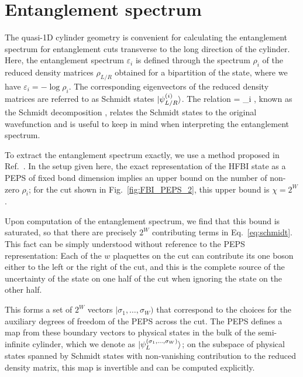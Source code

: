 
\newcommand{\uL}{\mathbf{L_0}}
\newcommand{\bL}{\mathbf{\bar{L}_0}}

\section{Entanglement spectrum}
\label{sec:ES}

The quasi-1D cylinder geometry is convenient for calculating the
entanglement spectrum for entanglement cuts transverse to the long direction of the
cylinder. Here, the entanglement spectrum $\varepsilon_i$ is defined through the spectrum
$\rho_i$ of the reduced density matrices $\rho_{L/R}$ obtained for a bipartition of the state,
where we have $\varepsilon_i = -\log \rho_i$.
The corresponding eigenvectors of the reduced density matrices
are referred to as Schmidt states $\vert \psi^{(i)}_{L/R} \rangle$. 
The relation 
\beq
\ket{\psi} = \sum\limits_i 
,
\label{eq:schmidt}
\eeq
known as the Schmidt decomposition \cite{Schmidt?},
relates the Schmidt states to the original wavefunction and is useful to keep in mind
when interpreting the entanglement spectrum.

To extract the entanglement spectrum exactly,
we use a method proposed in Ref.~.
In the setup given here, the exact representation of the HFBI state as a PEPS of
fixed bond dimension implies an upper bound on the number of non-zero $\rho_i$; 
for the cut shown in Fig.~\ref{fig:FBI_PEPS_2}, this upper bound is $\chi=2^W$.

Upon computation of the entanglement spectrum, we find that this bound is saturated,
so that there are precisely $2^W$ contributing terms in Eq.~\ref{eq:schmidt}.
This fact can be simply understood without reference to the PEPS representation:
Each of the $w$ plaquettes on the cut can contribute its one boson either to the left
or the right of the cut, and this is the complete source of the uncertainty
of the state on one half of the cut when ignoring the state on the other half.

This forms a set of $2^W$ vectors $|\sigma_1,\ldots,\sigma_W)$ that correspond to the
choices for the auxiliary degrees of freedom of the PEPS across the cut. The PEPS defines
a map from these boundary vectors to physical states in the bulk of the
semi-infinite cylinder, which we denote as $\vert \psi_L^{(\sigma_1, \ldots, \sigma_W)} \rangle$;
on the subspace of physical states spanned by Schmidt states with non-vanishing contribution
to the reduced density matrix, this map is invertible and can be computed explicitly.

